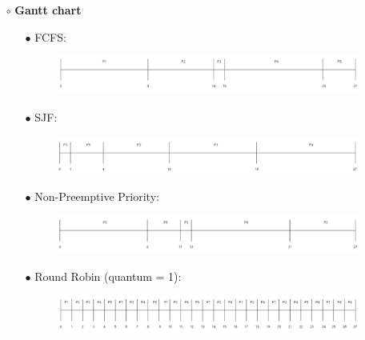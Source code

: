 \documentclass[13pt,a4paper]{article}
\begin{document}
		\begin{enumerate}
			\item[$\circ$] \textbf{Gantt chart}
				\begin{enumerate}
					\item[$\bullet$] FCFS:
						\begin{figure}[h!]
							\begin{center}
								\includegraphics[width=17cm]{fcfs.png}
							\end{center}
						\end{figure}
					\item[$\bullet$] SJF:
						\begin{figure}[h!]
							\begin{center}
								\includegraphics[width=17cm]{sjf.png}
							\end{center}
						\end{figure}
					\item[$\bullet$] Non-Preemptive Priority:
						\begin{figure}[h!]
							\begin{center}
								\includegraphics[width=17cm]{npp.png}
							\end{center}
						\end{figure}
					\item[$\bullet$] Round Robin (quantum = 1):
					\begin{figure}[h!]
						\begin{center}
							\includegraphics[width=17cm]{rr.png}
						\end{center}
					\end{figure}
				\end{enumerate}

\end{enumerate}
\end{document}
